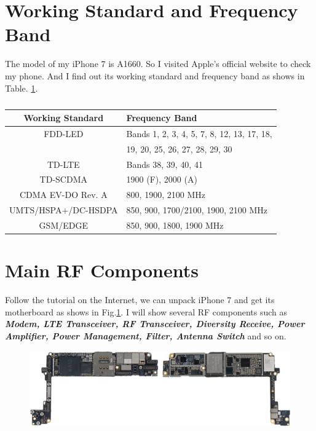 \documentclass[conference]{IEEEtran}
\begin{document}
\section{Working Standard and Frequency Band}\label{sec:wsfb}
The model of my iPhone 7 is A1660. So I visited Apple's official website to check my phone. And I find out its working standard and frequency band as shows in Table. \ref{table:Cellular and Wireless}.
\begin{table}[htbp]
	\centering
	\caption{}
	\begin{tabular}{c  l}
		\hline \hline
		Working Standard & Frequency Band\label{table:Cellular and Wireless} \\
		\hline
		FDD-LED	&Bands 1, 2, 3, 4, 5, 7, 8, 12, 13, 17, 18,\\ 
		&19, 20, 25, 26, 27, 28, 29, 30\\
		\hline
		TD-LTE	&Bands 38, 39, 40, 41\\
	    \hline
		TD-SCDMA&1900 (F), 2000 (A) \\
		\hline
		CDMA EV-DO Rev. A&800, 1900, 2100 MHz \\
		\hline
		UMTS/HSPA+/DC-HSDPA&850, 900, 1700/2100, 1900, 2100 MHz\\
		\hline
		GSM/EDGE&850, 900, 1800, 1900 MHz\\
		\hline \hline 
	\end{tabular}
\end{table}
\section{Main RF Components}\label{sec:rfc}
Follow the tutorial on the Internet, we can unpack iPhone 7 and get its motherboard as shows in Fig.\ref{fig:board}. I will show several RF components such as {\bfseries{\emph{Modem, LTE Transceiver, RF Transceiver, Diversity Receive, Power Amplifier, Power Management, Filter, Antenna Switch}}} and so on.
\begin{figure}[!ht]
	\centering
	\begin{center}
		\includegraphics*[width=0.8\linewidth]{board}
		\caption{}
		\label{fig:board}
	\end{center}
\end{figure}
\end{document}
